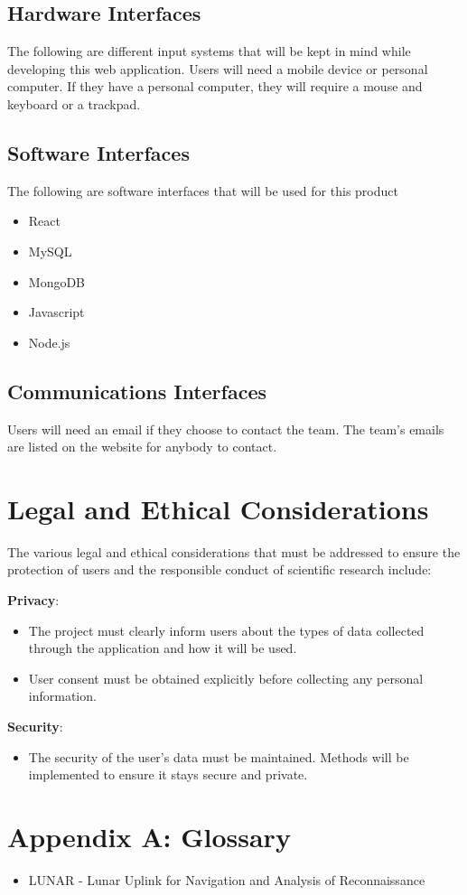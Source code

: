 \documentclass{article}
\begin{document}
\subsection{Hardware Interfaces}
The following are different input systems that will be kept in mind while developing this web application. Users will need a mobile device or personal computer. If they have a personal computer, they will require a mouse and keyboard or a trackpad.
\subsection{Software Interfaces}
The following are software interfaces that will be used for this product
\begin{itemize}
	\item React
	\item MySQL
	\item MongoDB
	\item Javascript
	\item Node.js
\end{itemize}
\subsection{Communications Interfaces}
Users will need an email if they choose to contact the team. The team’s emails are listed on the website for anybody to contact.

\section{Legal and Ethical Considerations}
The various legal and ethical considerations that must be addressed to ensure the protection of users and the responsible conduct of scientific research include:

\textbf{Privacy}:
\begin{itemize}
	\item The project must clearly inform users about the types of data collected through the application and how it will be used.
	\item User consent must be obtained explicitly before collecting any personal information.
\end{itemize}
\textbf{Security}: 
\begin{itemize}
	\item The security of the user’s data must be maintained. Methods will be implemented to ensure it stays secure and private.
\end{itemize}

\section{Appendix A: Glossary}
\begin{itemize}
	\item LUNAR - Lunar Uplink for Navigation and Analysis of Reconnaissance
\end{itemize}
\end{document}
